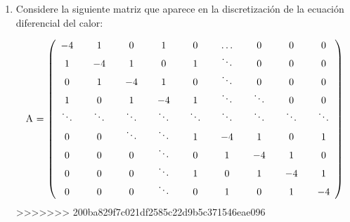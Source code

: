 \documentclass{udpreport}
\begin{document}
\begin{enumerate}
 	
 	\item  Considere la siguiente matriz que aparece en la discretización de la ecuación diferencial del calor:

    \[
    $A = $
 	\left(
 	\begin{array}{cccccccccccccccccccccc}
 	
 	  -4 && 1  && 0   && 1   && 0   && \dots && 0   && 0   && 0 \\
 	   1 && -4 && 1   && 0   && 1   && \ddots && 0   && 0   && 0 \\ 	   
 	   0 && 1  && -4  && 1   && 0   && \ddots && 0   && 0   && 0 \\ 	   
 	   1 && 0  && 1   && -4  && 1   && \ddots && \ddots && 0   && 0 \\ 	   
 	   \ddots && \ddots &&\ddots  && \ddots && \ddots && \ddots && \ddots && \ddots && \ddots \\ 	   
 	   0 && 0  && \ddots && \ddots && 1   && -4  && 1   && 0   && 1 \\ 	   
 	   0 && 0  && 0   && \ddots && 0   && 1   && -4  && 1   && 0 \\ 	   
 	   0 && 0  && 0   && \ddots && 1   && 0   && 1   && -4  && 1 \\ 	   
 	   0 && 0  && 0   && \ddots && 0   && 1   && 0   && 1   && -4 \\
 	   
 	\end{array}
 	\right) 
 	\]
>>>>>>> 200ba829f7c021df2585c22d9b5c371546eae096
 	

\end{enumerate}
\end{document}
